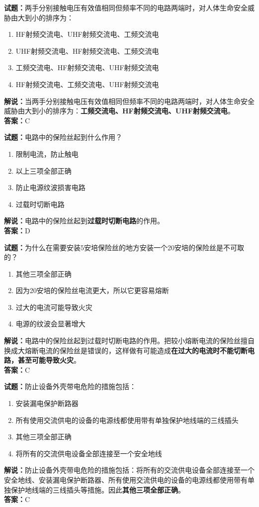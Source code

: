 \documentclass{ctexbook}
\begin{document}
\noindent\textbf{试题：}两手分别接触电压有效值相同但频率不同的电路两端时，对人体生命安全威胁由大到小的排序为：
\begin{enumerate}[leftmargin=3em]
  \item HF射频交流电、UHF射频交流电、工频交流电
  \item UHF射频交流电、HF射频交流电、工频交流电
  \item 工频交流电、HF射频交流电、UHF射频交流电
  \item HF射频交流电、工频交流电、UHF射频交流电
\end{enumerate}
\noindent\textbf{解说：}当两手分别接触电压有效值相同但频率不同的电路两端时，对人体生命安全威胁由大到小的排序为：\textbf{工频交流电、HF射频交流电、UHF射频交流电}。\\\noindent\textbf{答案：}C

\bigskip

\noindent\textbf{试题：}电路中的保险丝起到什么作用？
\begin{enumerate}[leftmargin=3em]
  \item 限制电流，防止触电
  \item 以上三项全部正确
  \item 防止电源纹波损害电路
  \item 过载时切断电路
\end{enumerate}
\noindent\textbf{解说：}电路中的保险丝起到\textbf{过载时切断电路}的作用。\\\noindent\textbf{答案：}D
\bigskip

\noindent\textbf{试题：}为什么在需要安装5安培保险丝的地方安装一个20安培的保险丝是不可取的？
\begin{enumerate}[leftmargin=3em]
  \item 其他三项全部正确
  \item 因为20安培的保险丝电流更大，所以它更容易熔断
  \item 过大的电流可能导致火灾
  \item 电源的纹波会显著增大
\end{enumerate}
\noindent\textbf{解说：}电路中的保险丝起到过载时切断电路的作用。把较小熔断电流的保险丝擅自换成大熔断电流的保险丝是错误的，这样做有可能造成\textbf{在过大的电流时不能切断电路，甚至可能导致火灾}。\\\noindent\textbf{答案：}C%

\bigskip

\noindent\textbf{试题：}防止设备外壳带电危险的措施包括：
\begin{enumerate}[leftmargin=3em]
  \item 安装漏电保护断路器
  \item 所有使用交流供电的设备的电源线都使用带有单独保护地线端的三线插头
  \item 其他三项全部正确
  \item 将所有的交流供电设备全部连接至一个安全地线
\end{enumerate}
\noindent\textbf{解说：}防止设备外壳带电危险的措施包括：将所有的交流供电设备全部连接至一个安全地线、安装漏电保护断路器、所有使用交流供电的设备的电源线都使用带有单独保护地线端的三线插头等措施。因此\textbf{其他三项全部正确}。\\\noindent\textbf{答案：}C
\end{document}
